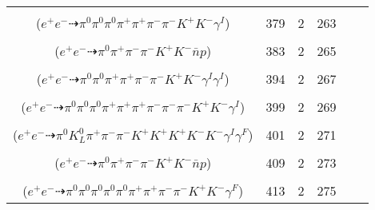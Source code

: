 \documentclass[landscape]{article}
\newcounter{rownumbers}
\newcommand\rn{\stepcounter{rownumbers}\arabic{rownumbers}}
\newcommand{\EOL}{\\} %
\newcommand{\topoTags}[1]{#1} %
\begin{document}
\begin{longtable}{clcccc}
\rn & \makecell[l]{ $ 
e^{+} e^{-} \rightarrow \pi^{+} \pi^{-} \rho^{+} \rho^{-} K^{-} K^{*+} \gamma^{I} ,
\rho^{+} \rightarrow \pi^{0} \pi^{+} ,
\rho^{-} \rightarrow \pi^{0} \pi^{-} ,
K^{*+} \rightarrow \pi^{0} K^{+} 
$ \\ ($
e^{+} e^{-} \dashrightarrow \pi^{0} \pi^{0} \pi^{0} \pi^{+} \pi^{+} \pi^{-} \pi^{-} K^{+} K^{-} \gamma^{I} 
$) } & \topoTags{379 & }2 & 263 \EOL

\rn & \makecell[l]{ $ 
e^{+} e^{-} \rightarrow \pi^{0} \pi^{+} \pi^{-} \pi^{-} K^{+} K^{-} \bar{n} p 
$ \\ ($
e^{+} e^{-} \dashrightarrow \pi^{0} \pi^{+} \pi^{-} \pi^{-} K^{+} K^{-} \bar{n} p 
$) } & \topoTags{383 & }2 & 265 \EOL

\rn & \makecell[l]{ $ 
e^{+} e^{-} \rightarrow \rho^{0} \pi^{-} \rho^{+} K^{+} K^{*-} \gamma^{I} \gamma^{I} ,
\rho^{0} \rightarrow \pi^{+} \pi^{-} ,
\rho^{+} \rightarrow \pi^{0} \pi^{+} ,
K^{*-} \rightarrow \pi^{0} K^{-} 
$ \\ ($
e^{+} e^{-} \dashrightarrow \pi^{0} \pi^{0} \pi^{+} \pi^{+} \pi^{-} \pi^{-} K^{+} K^{-} \gamma^{I} \gamma^{I} 
$) } & \topoTags{394 & }2 & 267 \EOL

\rn & \makecell[l]{ $ 
e^{+} e^{-} \rightarrow \pi^{0} \pi^{0} \rho^{0} \rho^{0} \omega K^{+} K^{-} \gamma^{I} ,
\rho^{0} \rightarrow \pi^{+} \pi^{-} ,
\rho^{0} \rightarrow \pi^{+} \pi^{-} ,
\omega \rightarrow \pi^{0} \pi^{+} \pi^{-} 
$ \\ ($
e^{+} e^{-} \dashrightarrow \pi^{0} \pi^{0} \pi^{0} \pi^{+} \pi^{+} \pi^{+} \pi^{-} \pi^{-} \pi^{-} K^{+} K^{-} \gamma^{I} 
$) } & \topoTags{399 & }2 & 269 \EOL

\rn & \makecell[l]{ $ 
e^{+} e^{-} \rightarrow \pi^{0} \pi^{+} \pi^{-} \bar{K}^{0} K^{*} K^{+} K^{-} \phi \gamma^{I} ,
\bar{K}^{0} \rightarrow K_{L}^{0} ,
K^{*} \rightarrow \pi^{-} K^{+} \gamma^{F} ,
\phi \rightarrow K^{+} K^{-} 
$ \\ ($
e^{+} e^{-} \dashrightarrow \pi^{0} K_{L}^{0} \pi^{+} \pi^{-} \pi^{-} K^{+} K^{+} K^{+} K^{-} K^{-} \gamma^{I} \gamma^{F} 
$) } & \topoTags{401 & }2 & 271 \EOL

\rn & \makecell[l]{ $ 
e^{+} e^{-} \rightarrow \pi^{+} \pi^{-} \rho^{-} K^{+} K^{-} \bar{n} p ,
\rho^{-} \rightarrow \pi^{0} \pi^{-} 
$ \\ ($
e^{+} e^{-} \dashrightarrow \pi^{0} \pi^{+} \pi^{-} \pi^{-} K^{+} K^{-} \bar{n} p 
$) } & \topoTags{409 & }2 & 273 \EOL

\rn & \makecell[l]{ $ 
e^{+} e^{-} \rightarrow \pi^{0} \pi^{0} \pi^{0} \pi^{0} \pi^{+} \pi^{-} \eta K^{+} K^{-} ,
\eta \rightarrow \pi^{0} \pi^{+} \pi^{-} \gamma^{F} 
$ \\ ($
e^{+} e^{-} \dashrightarrow \pi^{0} \pi^{0} \pi^{0} \pi^{0} \pi^{0} \pi^{+} \pi^{+} \pi^{-} \pi^{-} K^{+} K^{-} \gamma^{F} 
$) } & \topoTags{413 & }2 & 275 \EOL


\end{longtable}
\end{document}

